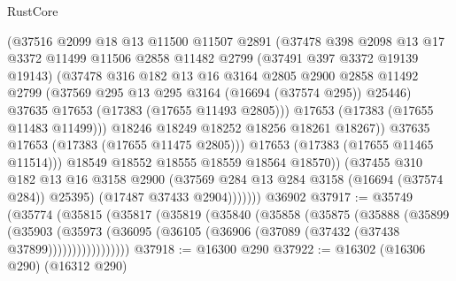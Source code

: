 \begin{lexlean}{RustCore}
\begin{coremodule}
                        (@37516
                          @2099
                          @18
                          @13
                          @11500
                          @11507
                          @2891
                          (@37478
                            @398
                            @2098
                            @13
                            @17
                            @3372
                            @11499
                            @11506
                            @2858
                            @11482
                            @2799
                            (@37491 @397 @3372 @19139 @19143)
                            (@37478
                              @316
                              @182
                              @13
                              @16
                              @3164
                              @2805
                              @2900
                              @2858
                              @11492
                              @2799
                              (@37569 @295 @13 @295 @3164 (@16694 (@37574 @295)) @25446)
                              @37635
                              @17653
                              (@17383 (@17655 @11493 @2805)))
                            @17653
                            (@17383 (@17655 @11483 @11499)))
                          @18246
                          @18249
                          @18252
                          @18256
                          @18261
                          @18267))
                      @37635
                      @17653
                      (@17383 (@17655 @11475 @2805)))
                    @17653
                    (@17383 (@17655 @11465 @11514)))
                  @18549
                  @18552
                  @18555
                  @18559
                  @18564
                  @18570))
              (@37455
                @310
                @182
                @13
                @16
                @3158
                @2900
                (@37569 @284 @13 @284 @3158 (@16694 (@37574 @284)) @25395)
                (@17487 @37433 @2904)))))))
    @36902
@37917 := @35749
    (@35774
      (@35815
        (@35817
          (@35819
            (@35840
              (@35858
                (@35875
                  (@35888
                    (@35899
                      (@35903
                        (@35973
                          (@36095 (@36105 (@36906 (@37089 (@37432 (@37438 @37899)))))))))))))))))
@37918 := @16300 @290
@37922 := @16302 (@16306 @290) (@16312 @290)

\end{coremodule}
\end{lexlean}
